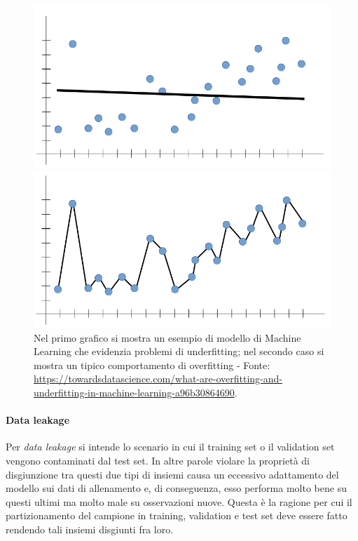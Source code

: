 \documentclass[12pt]{report}
\theoremstyle{definition}
\begin{document}
\begin{figure}
\centering
    \begin{minipage}{0.48\textwidth}
        \includegraphics[width=\linewidth]{images/underfitting.png}
    \end{minipage}
    \begin{minipage}{0.48\textwidth}
        \includegraphics[width=\linewidth]{images/overfitting.png}
    \end{minipage}
    \caption{Nel primo grafico si mostra un esempio di modello di Machine Learning che evidenzia problemi di underfitting; nel secondo caso si mostra un tipico comportamento di overfitting - Fonte: \url{https://towardsdatascience.com/what-are-overfitting-and-underfitting-in-machine-learning-a96b30864690}.}
    \label{underfittingoverfitting}
\end{figure} 

\paragraph{Data leakage} Per \textit{data leakage} si intende lo scenario in cui il training set o il validation set vengono contaminati dal test set. In altre parole violare la proprietà di disgiunzione tra questi due tipi di insiemi causa un eccessivo adattamento del modello sui dati di allenamento e, di conseguenza, esso performa molto bene su questi ultimi ma molto male su osservazioni nuove.
Questa è la ragione per cui il partizionamento del campione in training, validation e test set deve essere fatto rendendo tali insiemi disgiunti fra loro.
\end{document}
